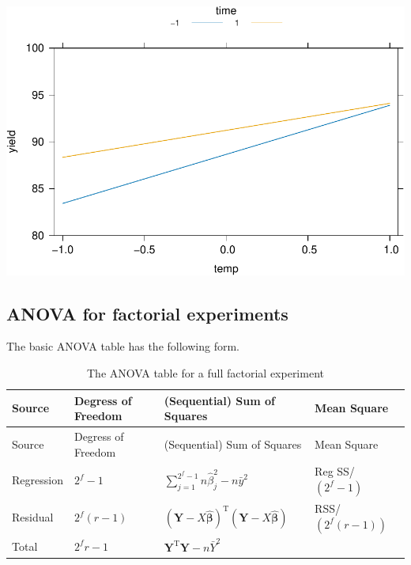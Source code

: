 \documentclass[
]{book}
\theoremstyle{definition}
\theoremstyle{definition}
\theoremstyle{definition}
\theoremstyle{definition}
\theoremstyle{remark}
\begin{document}
\includegraphics{bookdown_math3014-6027_files/figure-latex/desilylation-effects-1.pdf}

\hypertarget{anova-for-factorial-experiments}{%
\subsection{ANOVA for factorial experiments}\label{anova-for-factorial-experiments}}

The basic ANOVA table has the following form.

\begin{longtable}[]{@{}
  >{\raggedright\arraybackslash}p{}
  >{\raggedright\arraybackslash}p{}
  >{\raggedright\arraybackslash}p{}
  >{\raggedright\arraybackslash}p{}@{}}
\caption{\label{tab:anova-fact} The ANOVA table for a full factorial experiment}\tabularnewline
\toprule
Source & Degress of Freedom & (Sequential) Sum of Squares & Mean Square \\
\midrule
\endfirsthead
\toprule
Source & Degress of Freedom & (Sequential) Sum of Squares & Mean Square \\
\midrule
\endhead
Regression & \(2^f-1\) & \(\sum_{j=1}^{2^f-1}n\hat{\beta}_j^2 - n\bar{y}^2\) & Reg SS/\((2^f-1)\) \\
Residual & \(2^f(r-1)\) & \((\boldsymbol{Y}-X\hat{\boldsymbol{\beta}})^{\textrm{T}}(\boldsymbol{Y}-X\hat{\boldsymbol{\beta}})\) & RSS/\((2^f(r-1))\) \\
Total & \(2^fr-1\) & \(\boldsymbol{Y}^{\textrm{T}}\boldsymbol{Y}-n\bar{Y}^{2}\) & \\
\bottomrule
\end{longtable}
\end{document}
